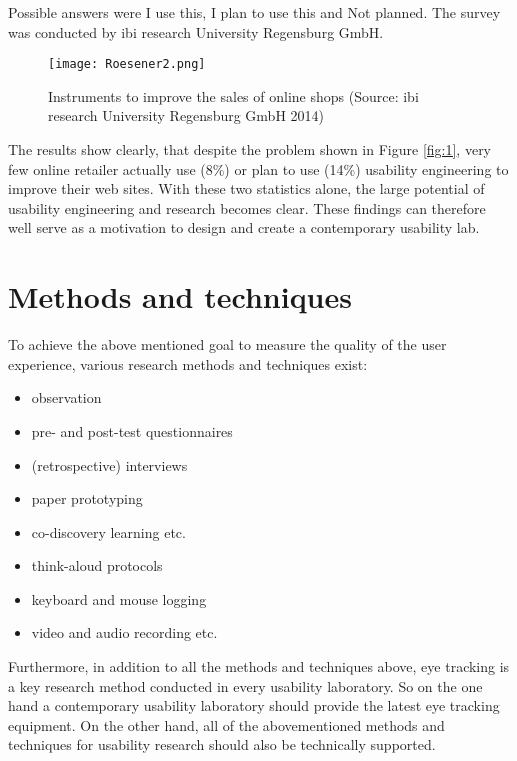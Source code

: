 \begin{
}[h]
Possible answers were {\textquotedbl}I use this{\textquotedbl}, {\textquotedbl}I plan to use this{\textquotedbl} and {\textquotedbl}Not planned{\textquotedbl}. The survey was conducted by ibi research University Regensburg GmbH. 

\begin{figure}[h]
 \texttt{[image: Roesener2.png]}
 \caption{Instruments to improve the sales of online shops (Source: ibi research University Regensburg GmbH 2014)}
 \label{fig:2}
\end{figure} 



The results show clearly, that despite the problem shown in Figure \ref{fig:1}, very few online retailer actually use (8\%) or plan to use (14\%) usability engineering to improve their web sites. With these two statistics alone, the large potential of usability engineering and research becomes clear. These findings can therefore well serve as a motivation to design and create a contemporary usability lab.

\section{Methods and techniques}

To achieve the above mentioned goal {\textquotedbl}to measure the quality of the user experience{\textquotedbl}, various research methods and techniques exist:

\begin{itemize}
\item observation
\item pre- and post-test questionnaires 
\item (retrospective) interviews 
\item paper prototyping 
\item co-discovery learning etc.
\item think-aloud protocols 
\item keyboard and mouse logging 
\item video and audio recording etc. 
\end{itemize}

Furthermore, in addition to all the methods and techniques above, eye tracking is a key research method conducted in every usability laboratory. So on the one hand a contemporary usability laboratory should provide the latest eye tracking equipment. On the other hand, all of the abovementioned methods and techniques for usability research should also be technically supported.


\end{
}
